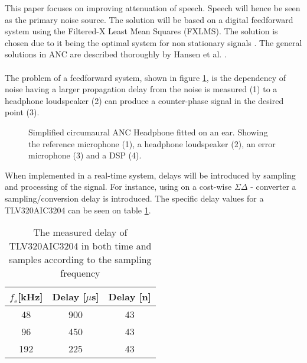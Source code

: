 This paper focuses on improving attenuation of speech. Speech will hence be seen as the primary noise source. The solution will be based on a digital feedforward system using the Filtered-X Least Mean Squares (FXLMS). The solution is chosen due to it being the optimal system for non stationary signals \cite{Hansen2}. The general solutions in ANC are described thoroughly by Hansen et al. \cite{Hansen}.
\\\\
The problem of a feedforward system, shown in figure \ref{fig:SystemOverview}, is the dependency of noise having a larger propagation delay from the noise is measured (1) to a headphone loudspeaker (2) can produce a counter-phase signal in the desired point (3). 
\begin{figure}[H]
	\centering
	
	\caption{Simplified circumaural ANC Headphone fitted on an ear. Showing the reference microphone (1), a headphone loudspeaker (2), an error microphone (3) and a DSP (4).}
	\label{fig:SystemOverview}
\end{figure}
When implemented in a real-time system, delays will be introduced by sampling and processing of the signal. For instance, using on a cost-wise $\Sigma\Delta$ - converter a sampling/conversion delay is introduced. The specific delay values for a TLV320AIC3204 can be seen on table \ref{tab:DelayResults}.


\begin{table}[H]
	\centering
	\begin{tabular}{ccc}
		$f_s$[kHz] & Delay [$\mu$s] & Delay [n] \\ \hline \hline
		48 & 900 & 43 \\ 
		96 & 450 & 43 \\
		192 & 225 & 43 
	\end{tabular} 
	\caption{The measured delay of TLV320AIC3204 in both time and samples according to the sampling frequency}
	\label{tab:DelayResults}
\end{table}

